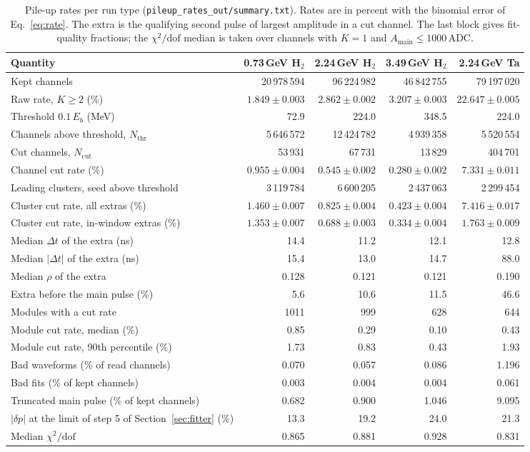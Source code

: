 \documentclass[11pt]{article}
\newcommand{\adc}{\,\mathrm{ADC}}
\newcommand{\code}[1]{\texttt{#1}}
\begin{document}
\begin{table}[htbp]
\centering
\caption{Pile-up rates per run type (\code{pileup\_rates\_out/summary.txt}). Rates are in percent with the binomial error of Eq.~\eqref{eq:rate}. The extra is the qualifying second pulse of largest amplitude in a cut channel. The last block gives fit-quality fractions; the $\chi^2/\mathrm{dof}$ median is taken over channels with $K = 1$ and $A_{\mathrm{main}} \le 1000\adc$.}
\label{tab:rates}
\small
\begin{tabular}{lrrrr}
\toprule
Quantity & 0.73\,GeV H$_2$ & 2.24\,GeV H$_2$ & 3.49\,GeV H$_2$ & 2.24\,GeV Ta \\
\midrule
Kept channels & 20\,978\,594 & 96\,224\,982 & 46\,842\,755 & 79\,197\,020 \\
Raw rate, $K \ge 2$ (\%) & $1.849 \pm 0.003$ & $2.862 \pm 0.002$ & $3.207 \pm 0.003$ & $22.647 \pm 0.005$ \\
Threshold $0.1\,E_b$ (MeV) & 72.9 & 224.0 & 348.5 & 224.0 \\
Channels above threshold, $N_{\mathrm{thr}}$ & 5\,646\,572 & 12\,424\,782 & 4\,939\,358 & 5\,520\,554 \\
Cut channels, $N_{\mathrm{cut}}$ & 53\,931 & 67\,731 & 13\,829 & 404\,701 \\
Channel cut rate (\%) & $0.955 \pm 0.004$ & $0.545 \pm 0.002$ & $0.280 \pm 0.002$ & $7.331 \pm 0.011$ \\
Leading clusters, seed above threshold & 3\,119\,784 & 6\,600\,205 & 2\,437\,063 & 2\,299\,454 \\
Cluster cut rate, all extras (\%) & $1.460 \pm 0.007$ & $0.825 \pm 0.004$ & $0.423 \pm 0.004$ & $7.416 \pm 0.017$ \\
Cluster cut rate, in-window extras (\%) & $1.353 \pm 0.007$ & $0.688 \pm 0.003$ & $0.334 \pm 0.004$ & $1.763 \pm 0.009$ \\
\midrule
Median $\Delta t$ of the extra (ns) & 14.4 & 11.2 & 12.1 & 12.8 \\
Median $|\Delta t|$ of the extra (ns) & 15.4 & 13.0 & 14.7 & 88.0 \\
Median $\rho$ of the extra & 0.128 & 0.121 & 0.121 & 0.190 \\
Extra before the main pulse (\%) & 5.6 & 10.6 & 11.5 & 46.6 \\
\midrule
Modules with a cut rate & 1011 & 999 & 628 & 644 \\
Module cut rate, median (\%) & 0.85 & 0.29 & 0.10 & 0.43 \\
Module cut rate, 90th percentile (\%) & 1.73 & 0.83 & 0.43 & 1.93 \\
\midrule
Bad waveforms (\% of read channels) & 0.070 & 0.057 & 0.086 & 1.196 \\
Bad fits (\% of kept channels) & 0.003 & 0.004 & 0.004 & 0.061 \\
Truncated main pulse (\% of kept channels) & 0.682 & 0.900 & 1.046 & 9.095 \\
$|\delta p|$ at the limit of step 5 of Section~\ref{sec:fitter} (\%) & 13.3 & 19.2 & 24.0 & 21.3 \\
Median $\chi^2/\mathrm{dof}$ & 0.865 & 0.881 & 0.928 & 0.831 \\
\bottomrule
\end{tabular}
\end{table}
\end{document}
